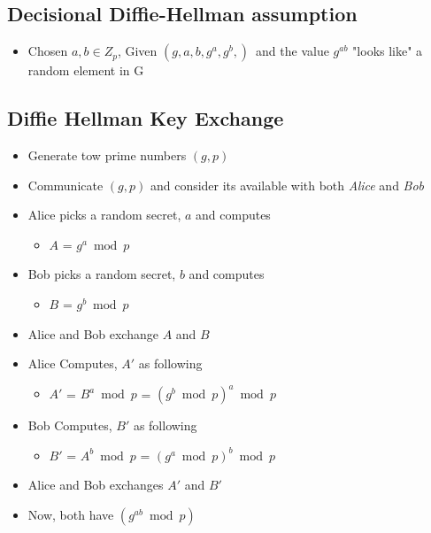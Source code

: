 \documentclass[12pt]{article}
\begin{document}
\subsection{Decisional Diffie-Hellman assumption}
\begin{itemize}
\item Chosen $a,b \in Z_p$, Given $(g,a,b,g^a,g^b,) \,$ and  the value $g^{ab}$ "looks like" a  random element in G
\end{itemize}

\subsection{Diffie Hellman Key Exchange}
\begin{itemize}
\item Generate tow prime numbers $(g,p)$
\item Communicate $(g,p)$ and consider its available with both \textit{Alice} and \textit{Bob}

\item Alice picks a random secret, $a$ and computes
\begin{itemize}
\item $A$ = $g^a \bmod p$
\end{itemize}

\item Bob picks a random secret, $b$ and computes
\begin{itemize}
\item $B$ = $g^b \bmod p$
\end{itemize}

\item Alice and Bob exchange $A$ and $B$

\item Alice Computes, $A'$ as following
\begin{itemize}
\item $A'$ = $B^a \bmod p$ = $(g^b \bmod p)^a \bmod p$
\end{itemize}

\item Bob Computes, $B'$ as following
\begin{itemize}
\item $B'$ = $A^b \bmod p$ = $(g^a \bmod p)^b \bmod p$
\end{itemize}

\item Alice and Bob exchanges $A'$ and $B'$
\item Now, both have $(g^{ab} \bmod p)$
\end{itemize}
\end{document}

